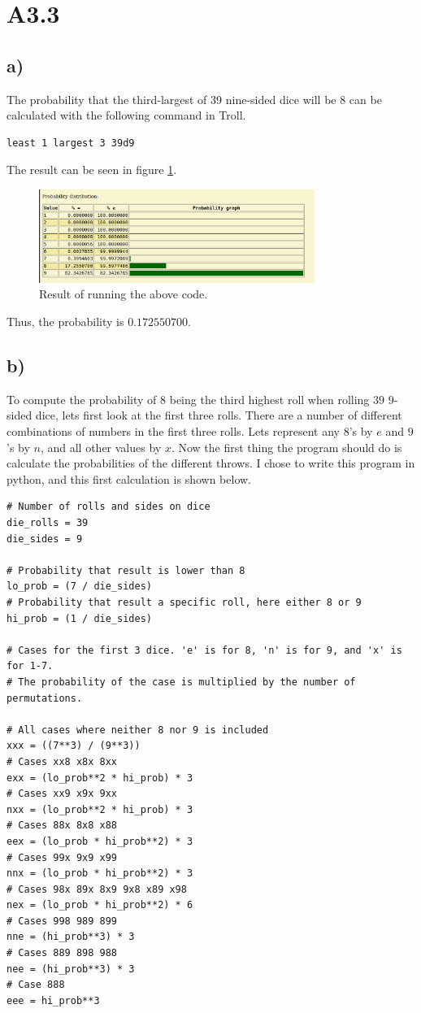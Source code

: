 \section*{A3.3}

\subsection*{a)}
The probability that the third-largest of 39 nine-sided dice will be 8 can be calculated with the following command in Troll.

\begin{verbatim}
least 1 largest 3 39d9
\end{verbatim}

The result can be seen in figure \ref{fig:troll}.

\begin{figure}[h]
\centering
\includegraphics[width=0.8\textwidth]{a33a.png}
\caption{Result of running the above code.}
\label{fig:troll}
\end{figure}

Thus, the probability is $0.172550700$.

\subsection*{b)}
To compute the probability of $8$ being the third highest roll when rolling $39$ $9$-sided dice, lets first look at the first three rolls. There are a number of different combinations of numbers in the first three rolls. Lets represent any $8$'s by $e$ and $9$'s by $n$, and all other values by $x$. Now the first thing the program should do is calculate the probabilities of the different throws. I chose to write this program in python, and this first calculation is shown below.

\begin{verbatim}
# Number of rolls and sides on dice
die_rolls = 39
die_sides = 9

# Probability that result is lower than 8
lo_prob = (7 / die_sides)
# Probability that result a specific roll, here either 8 or 9
hi_prob = (1 / die_sides)

# Cases for the first 3 dice. 'e' is for 8, 'n' is for 9, and 'x' is for 1-7.
# The probability of the case is multiplied by the number of permutations.

# All cases where neither 8 nor 9 is included
xxx = ((7**3) / (9**3))
# Cases xx8 x8x 8xx
exx = (lo_prob**2 * hi_prob) * 3
# Cases xx9 x9x 9xx
nxx = (lo_prob**2 * hi_prob) * 3
# Cases 88x 8x8 x88
eex = (lo_prob * hi_prob**2) * 3
# Cases 99x 9x9 x99
nnx = (lo_prob * hi_prob**2) * 3
# Cases 98x 89x 8x9 9x8 x89 x98
nex = (lo_prob * hi_prob**2) * 6
# Cases 998 989 899
nne = (hi_prob**3) * 3
# Cases 889 898 988
nee = (hi_prob**3) * 3
# Case 888
eee = hi_prob**3
\end{verbatim}

